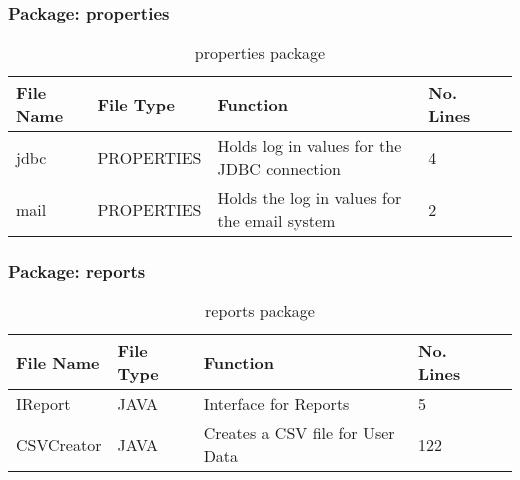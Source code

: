 \subsubsection{Package: properties}
\begin{table}[H]
\begin{center}
     \begin{tabular}{| l | l | l| l |p{1cm} |}
    \hline
    File Name & File Type & Function & No. Lines\\ \hline
    jdbc & PROPERTIES & Holds log in values for the JDBC connection & 4\\ \hline
	mail & PROPERTIES & Holds the log in values for the email system & 2\\ \hline
    \end{tabular}
\end{center}
\caption{properties package}
\end{table}

\subsubsection{Package: reports}
\begin{table}[H]
\begin{center}
     \begin{tabular}{| l | l | l| l |p{1cm} |}
    \hline
    File Name & File Type & Function & No. Lines\\ \hline
    IReport & JAVA & Interface for Reports & 5\\ \hline
	CSVCreator & JAVA & Creates a CSV file for User Data & 122\\ \hline
    \end{tabular}
\end{center}
\caption{reports package}
\end{table}

